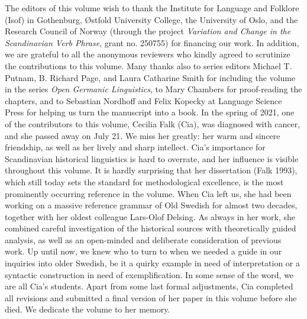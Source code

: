 The editors of this volume wish to thank the Institute for Language and Folklore (Isof) in Gothenburg, Østfold University College, the University of Oslo, and the Research Council of Norway (through the project \textit{Variation and Change in the Scandinavian Verb Phrase}, grant no. 250755) for financing our work. In addition, we are grateful to all the anonymous reviewers who kindly agreed to scrutinize the contributions to this volume. Many thanks also to series editors Michael T. Putnam, B. Richard Page, and Laura Catharine Smith for including the volume in the series \textit{Open Germanic Linguistics}, to Mary Chambers for proof-reading the chapters, and to Sebastian Nordhoff and Felix Kopecky at Language Science Press for helping us turn the manuscript into a book.
In the spring of 2021, one of the contributors to this volume, Cecilia Falk (Cia), was diagnosed with cancer, and she passed away on July 21. We miss her greatly: her warm and sincere friendship, as well as her lively and sharp intellect. Cia’s importance for Scandinavian historical linguistics is hard to overrate, and her influence is visible throughout this volume. It is hardly surprising that her dissertation (Falk 1993), which still today sets the standard for methodological excellence, is the most prominently occurring reference in the volume. When Cia left us, she had been working on a massive reference grammar of Old Swedish for almost two decades, together with her oldest colleague Lars-Olof Delsing. As always in her work, she combined careful investigation of the historical sources with theoretically guided analysis, as well as an open-minded and deliberate consideration of previous work. Up until now, we knew who to turn to when we needed a guide in our inquiries into older Swedish, be it a quirky example in need of interpretation or a syntactic construction in need of exemplification. In some sense of the word, we are all Cia’s students.
Apart from some last formal adjustments, Cia completed all revisions and submitted a final version of her paper in this volume before she died. We dedicate the volume to her memory.